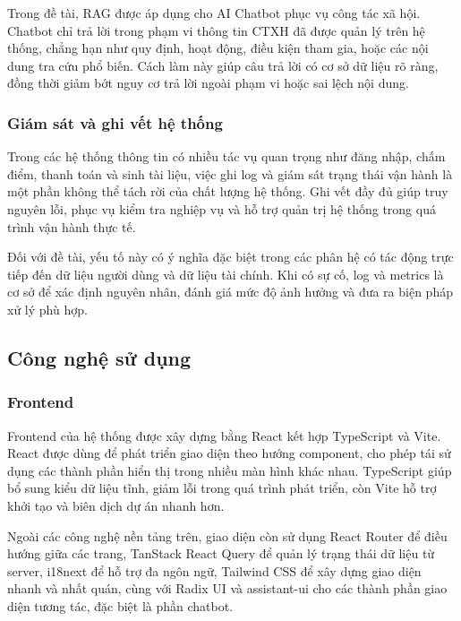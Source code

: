 Trong đề tài, RAG được áp dụng cho AI Chatbot phục vụ công tác xã hội. Chatbot chỉ trả lời trong phạm vi thông tin CTXH đã được quản lý trên hệ thống, chẳng hạn như quy định, hoạt động, điều kiện tham gia, hoặc các nội dung tra cứu phổ biến. Cách làm này giúp câu trả lời có cơ sở dữ liệu rõ ràng, đồng thời giảm bớt nguy cơ trả lời ngoài phạm vi hoặc sai lệch nội dung.

    \subsubsection{Giám sát và ghi vết hệ thống}
    Trong các hệ thống thông tin có nhiều tác vụ quan trọng như đăng nhập, chấm điểm, thanh toán và sinh tài liệu, việc ghi log và giám sát trạng thái vận hành là một phần không thể tách rời của chất lượng hệ thống. Ghi vết đầy đủ giúp truy nguyên lỗi, phục vụ kiểm tra nghiệp vụ và hỗ trợ quản trị hệ thống trong quá trình vận hành thực tế.

    Đối với đề tài, yếu tố này có ý nghĩa đặc biệt trong các phân hệ có tác động trực tiếp đến dữ liệu người dùng và dữ liệu tài chính. Khi có sự cố, log và metrics là cơ sở để xác định nguyên nhân, đánh giá mức độ ảnh hưởng và đưa ra biện pháp xử lý phù hợp.

\subsection{Công nghệ sử dụng}
\subsubsection{Frontend}
Frontend của hệ thống được xây dựng bằng React kết hợp TypeScript và Vite. React được dùng để phát triển giao diện theo hướng component, cho phép tái sử dụng các thành phần hiển thị trong nhiều màn hình khác nhau. TypeScript giúp bổ sung kiểu dữ liệu tĩnh, giảm lỗi trong quá trình phát triển, còn Vite hỗ trợ khởi tạo và biên dịch dự án nhanh hơn.

Ngoài các công nghệ nền tảng trên, giao diện còn sử dụng React Router để điều hướng giữa các trang, TanStack React Query để quản lý trạng thái dữ liệu từ server, i18next để hỗ trợ đa ngôn ngữ, Tailwind CSS để xây dựng giao diện nhanh và nhất quán, cùng với Radix UI và assistant-ui cho các thành phần giao diện tương tác, đặc biệt là phần chatbot.

